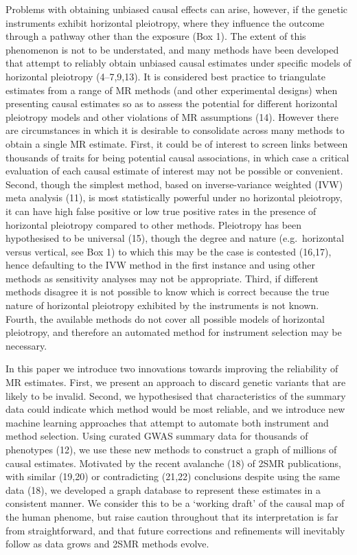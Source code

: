 \documentclass[]{article}
\begin{document}
Problems with obtaining unbiased causal effects can arise, however, if
the genetic instruments exhibit horizontal pleiotropy, where they
influence the outcome through a pathway other than the exposure (Box 1).
The extent of this phenomenon is not to be understated, and many methods
have been developed that attempt to reliably obtain unbiased causal
estimates under specific models of horizontal pleiotropy (4--7,9,13). It
is considered best practice to triangulate estimates from a range of MR
methods (and other experimental designs) when presenting causal
estimates so as to assess the potential for different horizontal
pleiotropy models and other violations of MR assumptions (14). However
there are circumstances in which it is desirable to consolidate across
many methods to obtain a single MR estimate. First, it could be of
interest to screen links between thousands of traits for being potential
causal associations, in which case a critical evaluation of each causal
estimate of interest may not be possible or convenient. Second, though
the simplest method, based on inverse-variance weighted (IVW) meta
analysis (11), is most statistically powerful under no horizontal
pleiotropy, it can have high false positive or low true positive rates
in the presence of horizontal pleiotropy compared to other methods.
Pleiotropy has been hypothesised to be universal (15), though the degree
and nature (e.g.~horizontal versus vertical, see Box 1) to which this
may be the case is contested (16,17), hence defaulting to the IVW method
in the first instance and using other methods as sensitivity analyses
may not be appropriate. Third, if different methods disagree it is not
possible to know which is correct because the true nature of horizontal
pleiotropy exhibited by the instruments is not known. Fourth, the
available methods do not cover all possible models of horizontal
pleiotropy, and therefore an automated method for instrument selection
may be necessary.

In this paper we introduce two innovations towards improving the
reliability of MR estimates. First, we present an approach to discard
genetic variants that are likely to be invalid. Second, we hypothesised
that characteristics of the summary data could indicate which method
would be most reliable, and we introduce new machine learning approaches
that attempt to automate both instrument and method selection. Using
curated GWAS summary data for thousands of phenotypes (12), we use these
new methods to construct a graph of millions of causal estimates.
Motivated by the recent avalanche (18) of 2SMR publications, with
similar (19,20) or contradicting (21,22) conclusions despite using the
same data (18), we developed a graph database to represent these
estimates in a consistent manner. We consider this to be a `working
draft' of the causal map of the human phenome, but raise caution
throughout that its interpretation is far from straightforward, and that
future corrections and refinements will inevitably follow as data grows
and 2SMR methods evolve.
\end{document}
